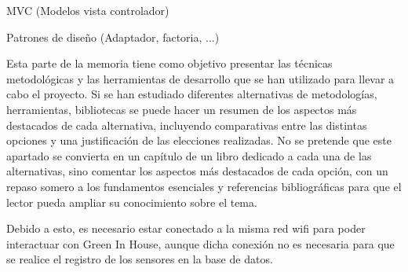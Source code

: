 
MVC (Modelos vista controlador)

Patrones de diseño (Adaptador, factoria, ...)



Esta parte de la memoria tiene como objetivo presentar las técnicas metodológicas y las herramientas de desarrollo que se han utilizado para llevar a cabo el proyecto. Si se han estudiado diferentes alternativas de metodologías, herramientas, bibliotecas se puede hacer un resumen de los aspectos más destacados de cada alternativa, incluyendo comparativas entre las distintas opciones y una justificación de las elecciones realizadas. 
No se pretende que este apartado se convierta en un capítulo de un libro dedicado a cada una de las alternativas, sino comentar los aspectos más destacados de cada opción, con un repaso somero a los fundamentos esenciales y referencias bibliográficas para que el lector pueda ampliar su conocimiento sobre el tema.


 Debido a esto, es necesario estar conectado a la misma red wifi para poder interactuar con Green In House, aunque dicha conexión no es necesaria para que se realice el registro de los sensores en la base de datos.
